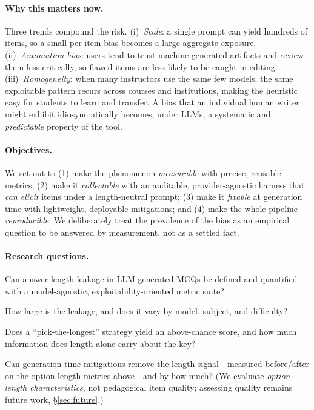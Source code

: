 \documentclass[10pt,twocolumn]{article}
\begin{document}
\paragraph{Why this matters now.} Three trends compound the risk.
(i)~\emph{Scale}: a single prompt can yield hundreds of items, so a small
per-item bias becomes a large aggregate exposure.
(ii)~\emph{Automation bias}: users tend to trust machine-generated artifacts
and review them less critically, so flawed items are less likely to be caught
in editing \citep{frontiers2026automation}.
(iii)~\emph{Homogeneity}: when many instructors use the same few models, the
same exploitable pattern recurs across courses and institutions, making the
heuristic easy for students to learn and transfer. A bias that an individual
human writer might exhibit idiosyncratically becomes, under LLMs, a systematic
and \emph{predictable} property of the tool.

\paragraph{Objectives.} We set out to (1) make the phenomenon
\emph{measurable} with precise, reusable metrics; (2) make it
\emph{collectable} with an auditable, provider-agnostic harness that \emph{can
elicit} items under a length-neutral prompt; (3) make it \emph{fixable} at generation
time with lightweight, deployable mitigations; and (4) make the whole pipeline
\emph{reproducible}. We deliberately treat the prevalence of the bias as an
empirical question to be answered by measurement, not as a settled fact.

\paragraph{Research questions.}
\begin{description}[leftmargin=1.4em,itemsep=1pt,topsep=2pt]
\item[RQ1.] Can answer-length leakage in LLM-generated MCQs be defined and
quantified with a model-agnostic, exploitability-oriented metric suite?
\item[RQ2.] How large is the leakage, and does it vary by model, subject, and
difficulty?
\item[RQ3.] Does a ``pick-the-longest'' strategy yield an above-chance score,
and how much information does length alone carry about the key?
\item[RQ4.] Can generation-time mitigations remove the length signal---measured
before/after on the option-length metrics above---and by how much? (We evaluate
\emph{option-length characteristics}, not pedagogical item quality; assessing
quality remains future work, \S\ref{sec:future}.)
\end{description}
\end{document}
